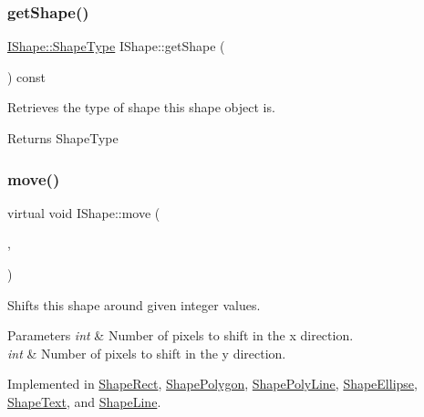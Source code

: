\mbox{\label{class_i_shape_a92764c3d0b0d12f0f1296cf1e3a392a8}} 
\subsubsection{\texorpdfstring{getShape()}{getShape()}}
{\footnotesize\ttfamily \mbox{\hyperlink{class_i_shape_a8f50993477b5ddb44c0547ef3d547cdc}{I\+Shape\+::\+Shape\+Type}} I\+Shape\+::get\+Shape (\begin{DoxyParamCaption}{ }\end{DoxyParamCaption}) const}



Retrieves the type of shape this shape object is. 

\begin{DoxyReturn}{Returns}
Shape\+Type 
\end{DoxyReturn}
\mbox{\label{class_i_shape_a3d23494cd34e658cc6b39a2e2db0b7fe}} 
\subsubsection{\texorpdfstring{move()}{move()}}
{\footnotesize\ttfamily virtual void I\+Shape\+::move (\begin{DoxyParamCaption}\item[{int}]{,  }\item[{int}]{ }\end{DoxyParamCaption})\hspace{0.3cm}{\ttfamily [pure virtual]}}



Shifts this shape around given integer values. 


\begin{DoxyParams}{Parameters}
{\em int} & Number of pixels to shift in the x direction. \\
\hline
{\em int} & Number of pixels to shift in the y direction. \\
\hline
\end{DoxyParams}


Implemented in \mbox{\hyperlink{class_shape_rect_a79fcc5998d54d1bfd851646479804b32}{Shape\+Rect}}, \mbox{\hyperlink{class_shape_polygon_a1f67f660d14090b21c00e2892f764451}{Shape\+Polygon}}, \mbox{\hyperlink{class_shape_poly_line_a7c1971596b171c4c08ec5657b6592354}{Shape\+Poly\+Line}}, \mbox{\hyperlink{class_shape_ellipse_a07ce6783744d01ccebbd5c2c8b4c7d9b}{Shape\+Ellipse}}, \mbox{\hyperlink{class_shape_text_ae7b73f317077c9873f4bd59c98b89c60}{Shape\+Text}}, and \mbox{\hyperlink{class_shape_line_a5b6d9bcf7ed64ab2454d5efa66486ee9}{Shape\+Line}}.

